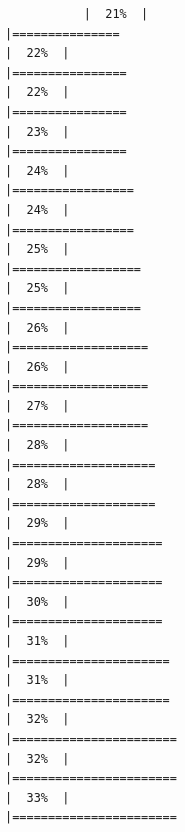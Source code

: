 \documentclass[
  ignorenonframetext,
]{beamer}
\begin{document}
\begin{frame}[fragile]{}
\begin{verbatim}
           |  21%  |                                                                              |===============                                                       |  22%  |                                                                              |================                                                      |  22%  |                                                                              |================                                                      |  23%  |                                                                              |================                                                      |  24%  |                                                                              |=================                                                     |  24%  |                                                                              |=================                                                     |  25%  |                                                                              |==================                                                    |  25%  |                                                                              |==================                                                    |  26%  |                                                                              |===================                                                   |  26%  |                                                                              |===================                                                   |  27%  |                                                                              |===================                                                   |  28%  |                                                                              |====================                                                  |  28%  |                                                                              |====================                                                  |  29%  |                                                                              |=====================                                                 |  29%  |                                                                              |=====================                                                 |  30%  |                                                                              |=====================                                                 |  31%  |                                                                              |======================                                                |  31%  |                                                                              |======================                                                |  32%  |                                                                              |=======================                                               |  32%  |                                                                              |=======================                                               |  33%  |                                                                              |=======================            
\end{verbatim}
\end{frame}
\end{document}
